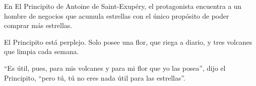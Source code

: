 \clearpage
\thispagestyle{empty}
%
\null\vfill
%
{
\begin{center}
\noindent
\centering
%
\parbox{0.8\textwidth}
{
\itshape
{
\raggedright
En El Principito de Antoine de Saint-Exupéry, el protagonista encuentra a un hombre de negocios que acumula estrellas con el único propósito de poder comprar más estrellas.

\bigskip

El Principito está perplejo. Solo posee una flor, que riega a diario, y tres volcanes que limpia cada semana.

\bigskip

\enquote{Es útil, pues, para mis volcanes y para mi flor que yo las posea}, dijo el Principito, \enquote{pero tú, tú no eres nada útil para las estrellas\textellipsis}.
}

\bigskip

\par%
}
\end{center}
}
\vfill